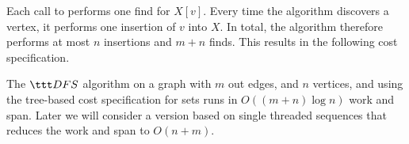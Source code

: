 Each call to \dfs{} performs one find for $X[v]$.  Every time the
algorithm discovers a vertex, it performs one insertion of $v$ into
$X$.  In total, the algorithm therefore performs at most $n$
insertions and $m+n$ finds.  This results in the following cost
specification.

\begin{costspec}[DFS]
  The $\dfs$ algorithm on a graph with $m$ out edges, and $n$
  vertices, and using the tree-based cost specification for sets runs
  in $O((m+n) \log n)$ work and span.  Later we will consider a
  version based on single threaded sequences that reduces the work and
  span to $O(n+m)$.
\end{costspec}


\begin{comment}
\subsection{Generalized DFS}

In DFS, depending on the application, it is sometimes useful to do
something when discovering a vertex (putting a white pebble on it),
sometimes when finishing a vertex (putting a red pebble on it), and
sometimes at both points.  Furthermore it is sometimes necessary to do
something when visiting non-tree edges.  These each correspond to
\emph{revisiting} an already visited vertex.  Based on this observation
we can define a generic version of DFS.  In this version we thread an
application dependent state through the DFS, and the
application supplies functions \discover{}, \finish{}, and \revisit{}
to update this state, if necessary.    These functions also take the vertex,
and the parent in the DFS tree.

\begin{tabular}{lcp{4in}}
\discover$(S,v,p)$ & : & $v$ is the
vertex being discovered, $p$ is its parent in the DFS,
and $S$ is the state when discovered.\\[.1in]

\finish$(S_1,S_2,v,p)$ & : & $S_1$ is the state when
the vertex $v$ was discovered, and $S_2$ is the state after visiting its
neighbors.\\[.1in]

\revisit$(S,v,p)$ & : & $S$ is
the state when the vertex $v$ is revisited, and $S_2$ is the state after
visiting the neighbors.
\end{tabular}


\end{comment}
